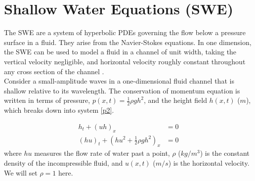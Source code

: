 \documentclass[12pt,a4paper]{article}
\begin{document}
	\section{Shallow Water Equations (SWE)}
	The SWE are a system of hyperbolic PDEs governing the flow below a pressure surface in a fluid. They arise from the Navier-Stokes equations.  In one dimension, the SWE  can be used to model a fluid in a channel of unit width, taking the vertical velocity negligible, and horizontal velocity roughly constant throughout any cross section of the channel \cite{ge:2008}.  \\
	
	Consider a small-amplitude waves in a one-dimensional fluid channel that is shallow relative to its wavelength. The conservation of momentum equation is written in terms of pressure, $p(x,t) = \frac{1}{2}\rho gh^{2}$, and the height field $h(x,t)$ ($m$), which breaks down into system \eqref{p2}.
	
	\begin{equation}
	\begin{aligned}
		h_{t} + (uh)_x &= 0 \\
		(hu)_t + \left(hu^{2} + \frac{1}{2}\rho gh^{2} \right)_x & = 0 
	\end{aligned}
	\label{p2}
	\end{equation}	
	where $hu$ measures the flow rate of water past a point,  $\rho$ ($kg/m^3$) is the constant density of the incompressible fluid, and $u(x,t)$ ($m/s$) is the horizontal velocity.  We will set $\rho = 1$ here.\\
	
\end{document}
